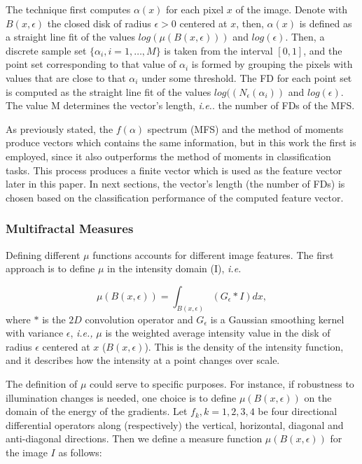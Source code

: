 The technique first computes $\alpha(x)$ for each pixel $x$ of the image. Denote with $B(x,\epsilon)$ the closed disk of radius $\epsilon > 0$ centered at $x$, then, $\alpha(x)$ is defined as a straight line fit of the values $log(\mu(B(x,\epsilon)))$ and $log(\epsilon)$. Then, a discrete sample set $\{\alpha_{i}, i = 1,\dots,M\}$ is taken from the interval $[0,1]$, and the point set corresponding to that value of $\alpha_{i}$ is formed by grouping the pixels with values that are close to that $\alpha_{i}$ under some threshold. The FD for each point set is computed as the straight line fit of the values $log((N_{\epsilon}(\alpha_{i}))$ and $log(\epsilon)$. The value M determines the vector's length, {\em i.e.}. the number of FDs of the MFS.


As previously stated, the $f(\alpha)$ spectrum (MFS) and the method of moments produce vectors which contains the same information, but in this work the first is employed, since it also outperforms the method of moments in classification tasks. This process produces a finite vector which is used as the feature vector later in this paper.  In next sections, the vector's length (the number of FDs) is chosen based on the classification performance of the computed feature vector.


\subsubsection{Multifractal Measures}
Defining different $\mu$ functions accounts for different image features. The first approach is to define $\mu$ in the intensity domain (I), {\em i.e.}

\begin{equation}
\mu(B(x,\epsilon)) = \int_{B(x,\epsilon)}{(G_{\epsilon} \ast I)} dx,
\label{eqn:eqn11}
\end{equation}
where $\ast$ is the $2D$ convolution operator and $G_{\epsilon}$ is a Gaussian smoothing kernel with variance $\epsilon$, {\em i.e., } $\mu$ is the weighted average intensity value in the disk of radius $\epsilon$ centered at $x$ ($B(x,\epsilon)$). This is the density of the intensity function, and it describes how the intensity at a point changes over scale.

The definition of $\mu$ could serve to specific purposes. For instance, if robustness to illumination changes is needed, one choice is to define $\mu(B(x,\epsilon))$ on the domain of the energy of the gradients. Let ${ f_{k} , k = 1, 2, 3, 4}$ be four directional differential operators along (respectively) the vertical, horizontal, diagonal and anti-dia\-gonal directions. Then we define a measure function $\mu(B(x,\epsilon))$ for the image $I$ as follows:

